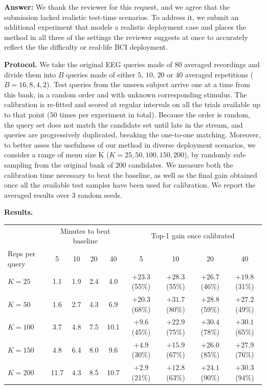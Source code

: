 \documentclass[11pt]{article}
\newcommand{\answer}[1]{{\textbf{Answer:} \color{blue} #1}}
\begin{document}
\answer{
We thank the reviewer for this request, and we agree that the submission lacked realistic test-time scenarios. To address it, we submit an additional experiment that models a realistic deployment case and places the method in all three of the settings the reviewer suggests at once to accurately reflect the the difficulty or real-life BCI deployment.

\textbf{Protocol.} We take the original EEG queries made of $80$ averaged recordings and divide them
into $B$ queries made of either $5$, $10$, $20$ or $40$ averaged repetitions ($B = 16, 8, 4, 2$). Test queries from the unseen subject arrive one at a time from this bank, in a random order and with unknown
corresponding stimulus. The calibration is re-fitted and scored at regular intervals on all the trials available up to that point ($50$ times per experiment in total). Because the order is random, the query set does not match the candidate set until late in the stream, and queries are progressively duplicated, breaking the one-to-one matching. Moreover, to better asses the usefulness of our method in diverse deployment scenarios, we consider a range of menu size K ($K = 25, 50, 100, 150, 200$), by randomly sub-sampling from the original bank of $200$ candidates. We measure both the calibration time necessary to beat the baseline, as well as the final gain obtained once all the available test samples have been used for calibration. We report the averaged results over 3 random seeds.

\textbf{Results.}

\begin{center}
\small\setlength{\tabcolsep}{4pt}
\begin{tabular}{lcccc|cccc}
\hline
& \multicolumn{4}{c|}{Minutes to beat baseline} & \multicolumn{4}{c}{Top-1 gain once calibrated} \\
Reps per query & 5 & 10 & 20 & 40 & 5 & 10 & 20 & 40 \\
\hline
$K=25$  & 1.1 & 1.9 & 2.4 & 4.0  & $+23.3$ (55\%) & $+28.3$ (55\%) & $+26.7$ (46\%) & $+19.8$ (31\%) \\
$K=50$  & 1.6 & 2.7 & 4.3 & 6.9  & $+20.3$ (68\%) & $+31.7$ (80\%) & $+28.8$ (59\%) & $+27.2$ (49\%) \\
$K=100$ & 3.7 & 4.8 & 7.5 & 10.1 & $+9.6$ (45\%)  & $+22.9$ (75\%) & $+30.4$ (78\%) & $+30.1$ (65\%) \\
$K=150$ & 4.8 & 6.4 & 8.0 & 9.6  & $+4.9$ (30\%)  & $+15.9$ (67\%) & $+26.0$ (85\%) & $+27.9$ (76\%) \\
$K=200$ & 11.7 & 4.3 & 8.5 & 10.7 & $+2.9$ (21\%) & $+12.8$ (63\%) & $+24.1$ (90\%) & $+30.3$ (94\%) \\
\hline
\end{tabular}
\end{center}

}
\end{document}

